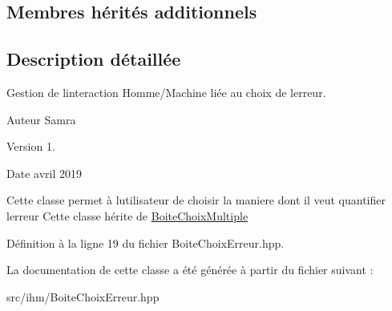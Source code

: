 \subsection*{Membres hérités additionnels}


\subsection{Description détaillée}
Gestion de l\textquotesingle{}interaction Homme/\+Machine liée au choix de l\textquotesingle{}erreur. 

\begin{DoxyAuthor}{Auteur}
Samra 
\end{DoxyAuthor}
\begin{DoxyVersion}{Version}
1. 
\end{DoxyVersion}
\begin{DoxyDate}{Date}
avril 2019
\end{DoxyDate}
Cette classe permet à l\textquotesingle{}utilisateur de choisir la maniere dont il veut quantifier l\textquotesingle{}erreur Cette classe hérite de \hyperlink{class_boite_choix_multiple}{Boite\+Choix\+Multiple} 

Définition à la ligne 19 du fichier Boite\+Choix\+Erreur.\+hpp.



La documentation de cette classe a été générée à partir du fichier suivant \+:\begin{DoxyCompactItemize}
\item 
src/ihm/Boite\+Choix\+Erreur.\+hpp\end{DoxyCompactItemize}
